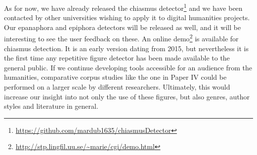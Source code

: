  
 As for now, we have already released the chiasmus detector\footnote{\url{https://github.com/mardub1635/chiasmusDetector}} and we have been contacted by other universities wishing to apply it to digital humanities projects\citep{Ullyot2017}. 
 Our epanaphora and epiphora detectors will be released as well, and it will be interesting to see the user feedback on these. An online demo\footnote{\url{http://stp.lingfil.uu.se/~marie/cgi/demo.html}} is available for chiasmus detection. It is an early version dating from 2015, but nevertheless it is the first time any repetitive figure detector has been made available to the general public. If we continue developing tools accessible for an audience from the humanities, comparative corpus studies like the one in Paper IV could be performed on a larger scale by different researchers. Ultimately, this would increase our insight into not only the use of these figures, but also genres, author styles and literature in general.%
